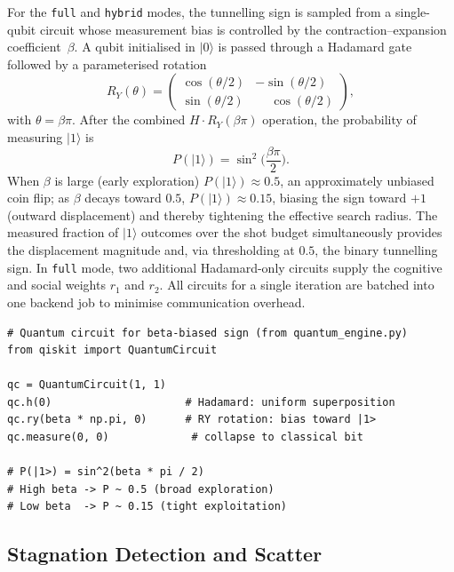 For the \texttt{full} and \texttt{hybrid} modes, the tunnelling sign is
sampled from a single-qubit circuit whose measurement bias is controlled
by the contraction--expansion coefficient~$\beta$.  A qubit initialised in
$|0\rangle$ is passed through a Hadamard gate followed by a parameterised
rotation
\begin{equation}
  R_Y(\theta) = \begin{pmatrix}
    \cos(\theta/2) & -\sin(\theta/2) \\
    \sin(\theta/2) & \phantom{-}\cos(\theta/2)
  \end{pmatrix},
  \label{eq:ry_gate}
\end{equation}
with $\theta = \beta\pi$.  After the combined $H \cdot R_Y(\beta\pi)$
operation, the probability of measuring $|1\rangle$ is
\begin{equation}
  P(|1\rangle) = \sin^2\!\biggl(\frac{\beta\pi}{2}\biggr).
  \label{eq:prob_one}
\end{equation}
When $\beta$ is large (early exploration) $P(|1\rangle) \approx 0.5$, an
approximately unbiased coin flip; as $\beta$ decays toward $0.5$,
$P(|1\rangle) \approx 0.15$, biasing the sign toward $+1$ (outward
displacement) and thereby tightening the effective search radius.  The measured
fraction of $|1\rangle$ outcomes over the shot budget simultaneously provides
the displacement magnitude and, via thresholding at $0.5$, the binary tunnelling
sign.  In \texttt{full} mode, two additional Hadamard-only circuits supply the
cognitive and social weights $r_1$ and $r_2$.  All circuits for a single
iteration are batched into one backend job to minimise communication overhead.

\begin{verbatim}
# Quantum circuit for beta-biased sign (from quantum_engine.py)
from qiskit import QuantumCircuit

qc = QuantumCircuit(1, 1)
qc.h(0)                     # Hadamard: uniform superposition
qc.ry(beta * np.pi, 0)      # RY rotation: bias toward |1>
qc.measure(0, 0)             # collapse to classical bit

# P(|1>) = sin^2(beta * pi / 2)
# High beta -> P ~ 0.5 (broad exploration)
# Low beta  -> P ~ 0.15 (tight exploitation)
\end{verbatim}


\subsection{Stagnation Detection and Scatter}
\label{app:stagnation}

